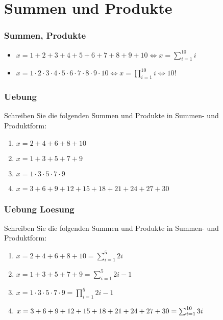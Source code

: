 \section{Summen und Produkte}
\begin{frame}
    \frametitle{Summen, Produkte}
    \begin{itemize}
        \vfill \item $x = 1+2+3+4+5+6+7+8+9+10 \iff x = \sum_{i=1}^{10} i$
        \vfill \item $x = 1 \cdot 2 \cdot 3 \cdot 4 \cdot 5 \cdot 6 \cdot 7 \cdot 8 \cdot 9 \cdot 10 \iff x = \prod_{i=1}^{10} i \iff 10!$
    \end{itemize}
\end{frame}

\begin{frame}
    \frametitle{Uebung}
    Schreiben Sie die folgenden Summen und Produkte in Summen- und Produktform:
    \begin{enumerate}
        \vfill \item $x = 2+4+6+8+10$
        \vfill \item $x = 1+3+5+7+9$
        \vfill \item $x = 1 \cdot 3 \cdot 5 \cdot 7 \cdot 9$
        \vfill \item $x = 3+6+9+12+15+18+21+24+27+30$
    \end{enumerate}
\end{frame}

\begin{frame}
    \frametitle{Uebung Loesung}
    Schreiben Sie die folgenden Summen und Produkte in Summen- und Produktform:
    \begin{enumerate}
        \vfill \item $x = 2+4+6+8+10 = \sum_{i=1}^{5} 2i$
        \vfill \item $x = 1+3+5+7+9 = \sum_{i=1}^{5} 2i-1$
        \vfill \item $x = 1 \cdot 3 \cdot 5 \cdot 7 \cdot 9 = \prod_{i=1}^{5} 2i-1$
        \vfill \item $x = 3+6+9+12+15+18+21+24+27+30
	\newline = \sum_{i=1}^{10} 3i$
    \end{enumerate}
\end{frame}
